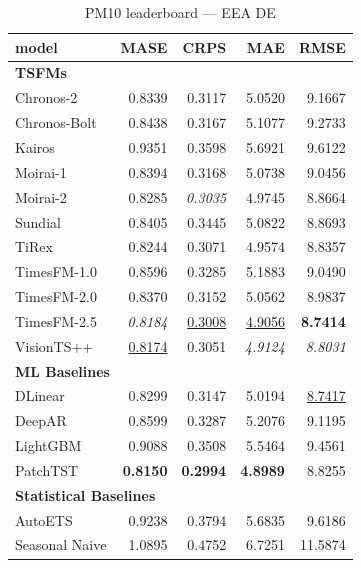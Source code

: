 \begin{table}[H]
\caption{PM10 leaderboard --- EEA DE}
\centering
\begin{small}
\begin{tabular}{lrrrr}
\toprule
model & MASE & CRPS & MAE & RMSE \\
\midrule
\multicolumn{5}{l}{\textbf{TSFMs}} \\
Chronos-2 & 0.8339 & 0.3117 & 5.0520 & 9.1667 \\
Chronos-Bolt & 0.8438 & 0.3167 & 5.1077 & 9.2733 \\
Kairos & 0.9351 & 0.3598 & 5.6921 & 9.6122 \\
Moirai-1 & 0.8394 & 0.3168 & 5.0738 & 9.0456 \\
Moirai-2 & 0.8285 & \textit{0.3035} & 4.9745 & 8.8664 \\
Sundial & 0.8405 & 0.3445 & 5.0822 & 8.8693 \\
TiRex & 0.8244 & 0.3071 & 4.9574 & 8.8357 \\
TimesFM-1.0 & 0.8596 & 0.3285 & 5.1883 & 9.0490 \\
TimesFM-2.0 & 0.8370 & 0.3152 & 5.0562 & 8.9837 \\
TimesFM-2.5 & \textit{0.8184} & \underline{0.3008} & \underline{4.9056} & \textbf{8.7414} \\
VisionTS++ & \underline{0.8174} & 0.3051 & \textit{4.9124} & \textit{8.8031} \\
\midrule
\multicolumn{5}{l}{\textbf{ML Baselines}} \\
DLinear & 0.8299 & 0.3147 & 5.0194 & \underline{8.7417} \\
DeepAR & 0.8599 & 0.3287 & 5.2076 & 9.1195 \\
LightGBM & 0.9088 & 0.3508 & 5.5464 & 9.4561 \\
PatchTST & \textbf{0.8150} & \textbf{0.2994} & \textbf{4.8989} & 8.8255 \\
\midrule
\multicolumn{5}{l}{\textbf{Statistical Baselines}} \\
AutoETS & 0.9238 & 0.3794 & 5.6835 & 9.6186 \\
Seasonal Naive & 1.0895 & 0.4752 & 6.7251 & 11.5874 \\
\bottomrule
\end{tabular}
\end{small}
\end{table}